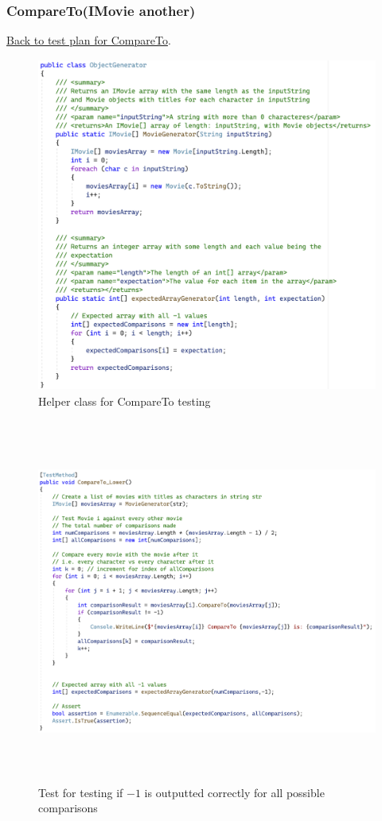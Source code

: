 \documentclass[a4paper]{article}
\begin{document}
\subsubsection{CompareTo{(IMovie another)}}
\hyperlink{subsubsection.3.1.1}{Back to test plan for CompareTo}.
\begin{figure}[H]
    \includegraphics[height=11cm]{data/ObjectGenerator.png}
    \caption{Helper class for CompareTo testing}
\end{figure}
\begin{figure}[H]
    \includegraphics[height=12cm]{data/CompareTo_Lower.png}
    \caption{Test for testing if $-1$ is outputted correctly for all possible comparisons}
\end{figure}
\end{document}
